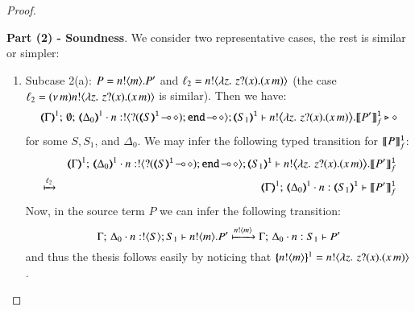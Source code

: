 \begin{proof}
\begin{enumerate}[1.]

%
		
\end{enumerate}
%
\noi \textbf{Part (2) - Soundness}. We consider two representative cases, the rest is similar or simpler:
%
\begin{enumerate}[1.]
	\item Subcase 2(a): $P = n ! \langle m \rangle . P'$ and $\ell_2 = n ! \langle \lambda z.\,\,z ? (x) . (x\, {m}) \rangle$
	(the case $\ell_2 = (\nu\, m)n ! \langle \lambda z.\,\,z ? (x) . (x\, {m}) \rangle$ is similar).
		Then 
		we have: %
%
		\[
			\mapt{\Gamma}^{1};\, \emptyset;\, \mapt{\Delta_0}^{1} \cat 
			n: \btout{\lhot{\btinp{\lhot{\tmap{S}{1}}}\tinact}} \tmap{S_1}{1} 
			\proves 
			 \bbout{n}{ \abs{z}{\,\binp{z}{x} (\appl{x}{m})} } \pmapp{P'}{1}{f} 
			 \hastype \Proc
		\]
%
		for some $S, S_1$, and $\Delta_0$. 
		We may infer the following typed transition for $\llbracket P\rrbracket^\mathtt{1}_f$:
%
		\begin{eqnarray*}
			& & \mapt{\Gamma}^{1};\, \mapt{\Delta_0}^{1} \cat n: \btout{\lhot{\btinp{\lhot{\tmap{S}{1}}}\tinact}} \tmap{S_1}{1} 
			\proves 
			 \bbout{n}{ \abs{z}{\,\binp{z}{x} (\appl{x}{m})} } \pmapp{P'}{1}{f} 
			 \\
			&\hby{\ell_2}& 
			\mapt{\Gamma}^{1};\, \mapt{\Delta_0}^{1} \cat n: \tmap{S_1}{1} 
			\proves  \pmapp{P'}{1}{f} 
		\end{eqnarray*}
%
		Now, in the source term $P$ we can infer the following transition: 
%
		\[
		\Gamma;\,  \Delta_0 \cdot n:! \langle S \rangle ; S_1 \vdash n ! \langle m \rangle . P'
		 \xmapsto{n !\langle m \rangle} 
		 \Gamma;\,  \Delta_0 \cdot n: S_1 \vdash P'
		\]
%
		and thus the thesis follows easily by noticing that 
		$\{\!\!\{n ! \langle m \rangle\}\!\!\}^{1} = n ! \langle \lambda z.\,\,z ? (x) . (x\, {m}) \rangle$.



\end{enumerate}
\end{proof}
